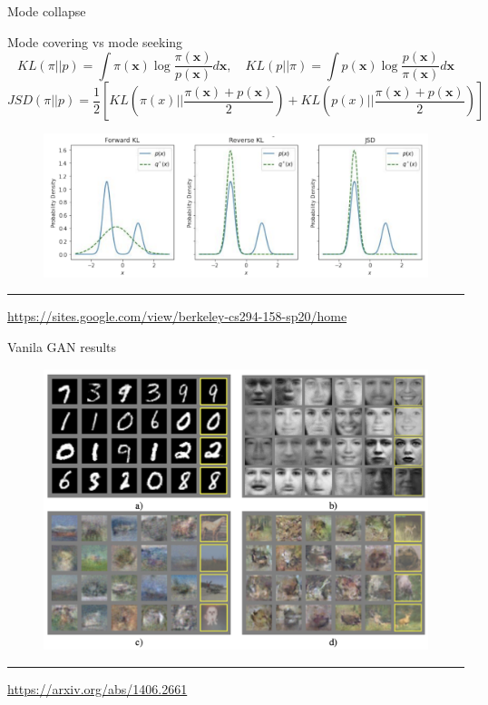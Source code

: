\documentclass{beamer}
\newcommand{\bx}{\mathbf{x}}
\begin{document}
\begin{frame}{Mode collapse}
	\begin{block}{Mode covering vs mode seeking}
		\vspace{-0.2cm}
		\[
			KL(\pi || p) = \int \pi(\bx) \log \frac{\pi(\bx)}{p(\bx)}d\bx, \quad KL(p || \pi) = \int p(\bx) \log \frac{p(\bx)}{\pi(\bx)}d\bx
		\]
		\[
		JSD(\pi || p) = \frac{1}{2} \left[KL \left(\pi(x) || \frac{\pi(\bx) + p(\bx)}{2}\right) + KL \left(p(x) || \frac{\pi(\bx) + p(\bx)}{2}\right) \right]
		\]
		\vspace{-0.4cm}
		\begin{figure}
			\centering
			\includegraphics[width=0.7\linewidth]{figs/mode_collapse_2}
		\end{figure}
	\vspace{-0.3cm}
	\end{block}
	\vfill
	\hrule\medskip
	{\scriptsize \href{https://sites.google.com/view/berkeley-cs294-158-sp20/home}{https://sites.google.com/view/berkeley-cs294-158-sp20/home}}
\end{frame}
\begin{frame}{Vanila GAN results}
	\begin{figure}
		\centering
		\includegraphics[width=0.95\linewidth]{figs/vanila_gan_results}
	\end{figure}
	\vfill
	\hrule\medskip
	{\scriptsize \href{https://arxiv.org/abs/1406.2661}{https://arxiv.org/abs/1406.2661}}
\end{frame}
\end{document}
